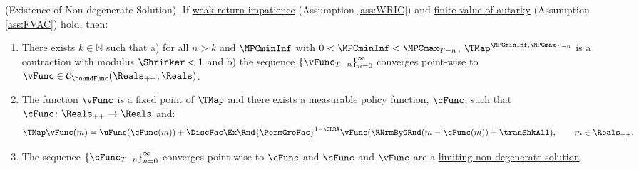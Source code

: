 \documentclass[BufferStockTheory]{subfiles}
\begin{document}
\hypertarget{Sufficient-Conditions-For-non-degenerate-Solution}{}
\begin{theorem}(Existence of Non-degenerate Solution).
\label{thm:convgtobellman}
If \hyperlink{WRIC}{weak return impatience} (Assumption \ref{ass:WRIC}) and \hyperlink{FVAC}{finite value of autarky} (Assumption \ref{ass:FVAC}) hold, then:
%
\begin{enumerate}[label=(\roman*)]
\item There exists $k\in \mathbb{N}$ such that a) for all $n>k$ and $\MPCminInf$ with $0<\MPCminInf<\MPCmax_{T-n}$, $\TMap^{\MPCminInf, \MPCmax_{T-n}}$ is a contraction with modulus $\Shrinker<1$ and b) the sequence $\left\{\vFunc_{T-n}\right\}_{n=0}^{\infty}$ converges point-wise to $\vFunc \in \mathcal{C}_{\boundFunc}(\Reals_{++},\Reals)$.
\item The function $\vFunc$ is a fixed point of $\TMap$ and there exists a measurable policy function, $\cFunc$, such that $\cFunc\colon \Reals_{++}\rightarrow \Reals$ and:
\begin{equation}\label{eq:stationarybellman}
\TMap\vFunc(m) =  \uFunc(\cFunc(m)) + \DiscFac\Ex \Rnd{\PermGroFac}^{1-\CRRA}\vFunc(\RNrmByGRnd(m-\cFunc(m)) + \tranShkAll) , \qquad m\in \Reals_{++}. 
\end{equation}
\item  The sequence $\left\{\cFunc_{T-n}\right\}_{n=0}^{\infty}$ converges point-wise to $\cFunc$ and $\cFunc$ and $\vFunc$ are a \hyperlink{Definition-of-a-non-degenerate-Solution}{limiting non-degenerate solution}.
\end{enumerate}
\end{theorem}
\end{document}
